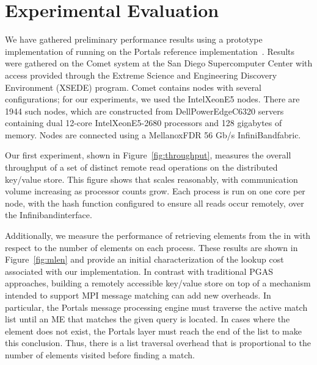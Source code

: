 \section{Experimental Evaluation}
\label{sec:results}

We have gathered preliminary performance results using a prototype
implementation of \pdht running on the Portals reference
implementation~\cite{portals-code}.  Results were gathered on the Comet
system at the San Diego Supercomputer Center with access provided
through the Extreme Science and Engineering Discovery Environment (XSEDE)
program.  Comet contains nodes with several configurations; for our
experiments, we used the Intel\regtm Xeon\regtm E5 nodes.  There are 1944 such
nodes, which are constructed from Dell\othertm PowerEdge\othertm C6320 servers
containing dual 12-core Intel\regtm Xeon\regtm E5-2680 processors and 128
gigabytes of memory.  Nodes are connected using a Mellanox\othertm FDR 56 Gb/s
InfiniBand\othertm fabric.

Our first experiment, shown in Figure~\ref{fig:throughput}, measures
the overall throughput of a set of distinct remote read operations on
the distributed key/value store. This figure shows that \pdht scales
reasonably, with communication volume increasing as processor counts
grow. Each \pdht process is run on one core per node, with the hash
function configured to ensure all reads occur remotely, over the
Infiniband\othertm interface.


Additionally, we measure the performance of retrieving elements from
the \pdht in with respect to the number of elements on each process.
These results are shown in Figure~\ref{fig:mlen} and provide an
initial characterization of the lookup cost associated with our \pdht
implementation.  In contrast with traditional PGAS approaches,
building a remotely accessible key/value store on top of a mechanism
intended to support MPI message matching can add new overheads.  In
particular, the Portals message processing engine must traverse the
active match list until an ME that matches the given query is located.
In cases where the element does not exist, the Portals layer must
reach the end of the list to make this conclusion.  Thus, there is a
list traversal overhead that is proportional to the number of elements
visited before finding a match.

